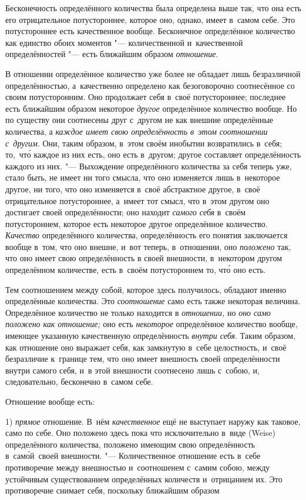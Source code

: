 Бесконечность определённого количества была определена выше так, что она
есть его отрицательное потустороннее, которое оно, однако, имеет в~самом
себе. Это потустороннее есть качественное вообще. Бесконечное определённое
количество как единство обоих моментов "--- количественной и~качественной
определённостей "--- есть ближайшим образом {\em отношение}.

В отношении определённое количество уже более не обладает лишь безразличной
определённостью, а~качественно определено как безоговорочно соотнесённое со
своим потусторонним. Оно продолжает себя в~своё потустороннее; последнее есть
ближайшим образом некоторое {\em другое} определённое количество вообще. Но по
существу они соотнесены друг с~другом не как внешние определённые количества, а
{\em каждое имеет свою определённость в~этом соотношении с~другим}. Они, таким
образом, в~этом своём инобытии возвратились в~себя; то,~чт\'{о} каждое из них
есть, оно есть в~другом; другое составляет определённость каждого из них. "---
Выхождение определённого количества за себя теперь уже, стало быть, не имеет ни
того смысла, что оно изменяется лишь в~некоторое другое, ни того, что оно
изменяется в~своё абстрактное другое, в~своё отрицательное потустороннее,
а~имеет тот смысл, что в~этом другом оно достигает своей определённости; оно
находит {\em самого себя} в~своём потустороннем, которое есть некоторое другое
определённое количество. {\em Качество} определённого количества,
определённость его понятия заключается вообще в~том, что оно внешне, и~вот
теперь, в~отношении, оно {\em положено} так, что оно имеет свою определённость
в своей внешности, в~некотором другом определённом количестве, есть в~своём
потустороннем то, чт\'{о} оно есть.

Тем соотношением между собой, которое здесь получилось, обладают именно
определённые количества. Это {\em соотношение} само есть также некоторая
величина. Определённое количество не только находится в {\em отношении,} но
{\em оно само положено как отношение;} оно есть {\em некоторое} определённое
количество вообще, имеющее указанную качественную определённость
{\em внутри себя}. Таким образом, как отношение оно выражает себя, как
замкнутую в~себе целостность, и~своё безразличие к~границе тем, что оно имеет
внешность своей определённости внутри самого себя, и~в этой внешности
соотнесено лишь с~собою, и, следовательно, бесконечно в~самом себе.

Отношение вообще есть:

1) {\em прямое} отношение. В~нём {\em качественное} ещё не выступает наружу как
таковое, само по себе. Оно положено здесь пока что
исключительно в~виде (Weise) определённого количества, положено имеющим свою
определённость в~сам\'{о}й~своей внешности. "--- Количественное отношение есть
в~себе противоречие между внешностью и~соотношенем с~самим собою, между устойчивым существованием
определённых количеств и~отрицанием их. Это противоречие снимает себя, поскольку
ближайшим образом

